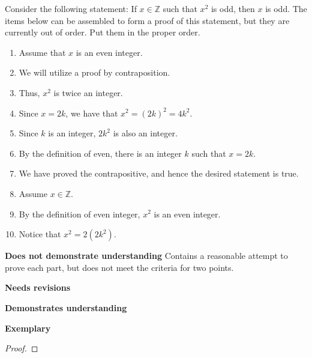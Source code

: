 \documentclass[letterpaper, 11pt]{ximera}
\begin{document}
\begin{ex}
Consider the following statement: If $x\in\mathbb{Z}$ such that $x^2$ is odd, then $x$ is odd.
The items below can be assembled to form a proof of this statement, but they are currently out of order.  Put them in the proper order.
\begin{enumerate}
	\item Assume that $x$ is an even integer.
	\item We will utilize a proof by contraposition.
	\item Thus, $x^2$ is twice an integer.
	\item Since $x=2k$, we have that $x^2 =(2k)^2 =4k^2$.
	\item Since $k$ is an integer, $2k^2$ is also an integer.
	\item By the definition of even, there is an integer $k$ such that $x=2k$.
	\item We have proved the contrapositive, and hence the desired statement is true.
	\item Assume $x\in \mathbb{Z}$.
	\item By the definition of even integer, $x^2$ is an even integer.
	\item Notice that $x^2 = 2(2k^2)$.
\end{enumerate}
\end{ex}

\begin{writeRubric}
    \item \textbf{Does not demonstrate understanding}
     Contains a reasonable attempt to prove each part, but does not meet the criteria for two points.
    \item \textbf{Needs revisions}
     
    \item \textbf{Demonstrates understanding}
    
    \item \textbf{Exemplary}
        
\end{writeRubric}
\begin{proof}%
\end{proof}


	
\end{document}
